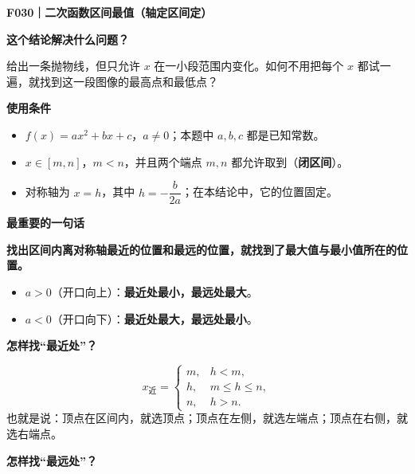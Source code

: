 \begin{statementbox}


\textbf{\textcolor{CStatement}{F030｜二次函数区间最值（轴定区间定）}}

\medskip
\textbf{\textcolor{CStatement}{这个结论解决什么问题？}}

给出一条抛物线，但只允许 $x$ 在一小段范围内变化。如何不用把每个 $x$ 都试一遍，就找到这一段图像的最高点和最低点？

\medskip
\end{statementbox}\clearpage\begin{statementbox}\textbf{\textcolor{CStatement}{使用条件}}
\begin{itemize}[leftmargin=*,itemsep=0.25em]
\item $f(x)=ax^2+bx+c$，$a\ne0$；本题中 $a,b,c$ 都是已知常数。
\item $x\in[m,n]$，$m<n$，并且两个端点 $m,n$ 都允许取到（\textbf{闭区间}）。
\item 对称轴为 $x=h$，其中 $h=-\dfrac{b}{2a}$；在本结论中，它的位置固定。
\end{itemize}

\medskip
\textbf{\textcolor{CStatement}{最重要的一句话}}

\textbf{找出区间内离对称轴最近的位置和最远的位置，就找到了最大值与最小值所在的位置。}

\begin{itemize}[leftmargin=*,itemsep=0.3em]
\item $a>0$（开口向上）：\textbf{最近处最小，最远处最大}。
\item $a<0$（开口向下）：\textbf{最近处最大，最远处最小}。
\end{itemize}

\medskip
\end{statementbox}\clearpage\begin{statementbox}\textbf{\textcolor{CStatement}{怎样找“最近处”？}}


\[
 x_{\text{近}}=\begin{cases}
 m,&h<m,\\
 h,&m\le h\le n,\\
 n,&h>n.
 \end{cases}
\]
也就是说：顶点在区间内，就选顶点；顶点在左侧，就选左端点；顶点在右侧，就选右端点。

\medskip
\end{statementbox}\clearpage\begin{statementbox}\textbf{\textcolor{CStatement}{怎样找“最远处”？}}




\end{statementbox}
